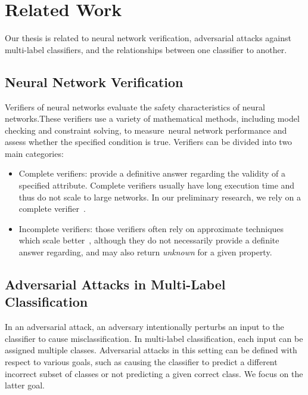 
\section{Related Work}
Our thesis is related to neural network verification, adversarial attacks against multi-label classifiers, and the relationships between one classifier to another.

\subsection{Neural Network Verification}\label{subsec:verifiers}
Verifiers of neural networks evaluate the safety characteristics of neural networks.These verifiers use a variety of mathematical methods, including model checking and constraint solving, to measure neural network performance and assess whether the specified condition is true. Verifiers can be divided into two main categories:
\begin{itemize}
    \item  Complete verifiers: provide a definitive answer regarding the validity of a specified attribute.
    Complete verifiers usually have long execution time and thus do not scale to large networks.
        In our preliminary research, we rely on a complete verifier~\cite{MIPVERIFY}.
    \item Incomplete verifiers: those verifiers often rely on approximate techniques which scale better~\cite{INCOMPLETE1, INCOMPLETE2}, although they do not necessarily provide a definite answer regarding, and may also return \emph{unknown} for a given property. 
\end{itemize}


\subsection{Adversarial Attacks in Multi-Label Classification}
In an adversarial attack, an adversary intentionally perturbs an input to the classifier to cause misclassification.
In multi-label classification, each input can be assigned multiple classes.
Adversarial attacks in this setting can be defined with respect to various goals, such as causing the classifier to predict a different incorrect subset of classes or not predicting a given correct class.
We focus on the latter goal.

